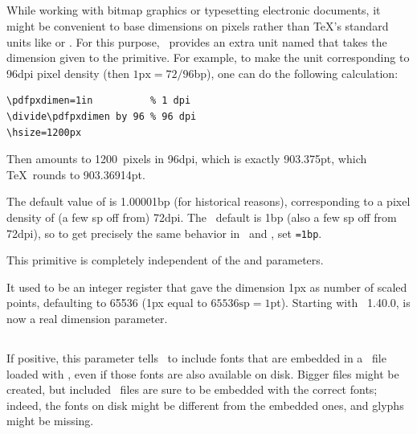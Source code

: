 \documentclass{pdftexmanual}
\begin{document}
\subsection{}

While working with bitmap graphics or typesetting electronic documents,
it might be convenient to base dimensions on pixels rather than \TeX's
standard units like  or . For this purpose, \PDFTEX\
provides an extra unit named  that takes the dimension given to
the \cs{pdfpxdimen} primitive. For example, to make the unit \type{px}
corresponding to 96dpi pixel density (then $\mbox{1px}=72/96$bp), one
can do the following calculation:

\begin{verbatim}
\pdfpxdimen=1in          % 1 dpi
\divide\pdfpxdimen by 96 % 96 dpi
\hsize=1200px
\end{verbatim}

Then  amounts to 1200~pixels in 96dpi, which is exactly
903.375pt, which \TeX\ rounds to 903.36914pt.

The default value of  is 1.00001bp (for historical
reasons), corresponding to a pixel density of (a few sp off from) 72dpi.
The \LUATEX\ default is 1bp (also a few sp off from 72dpi), so to get
precisely the same behavior in \PDFTEX\ and \LUATEX, set
\texttt{=1bp}.

This primitive is completely independent of the
 and  parameters.

 It used to be an integer register that gave the
dimension 1px as number of scaled points, defaulting to 65536 (1px equal
to $\mbox{65536sp}=1$pt). Starting with \PDFTEX\ 1.40.0, \cs{pdfpxdimen}
is now a real dimension parameter.

\subsection{}

If positive, this parameter tells \PDFTEX\ to include fonts that are
embedded in a \PDF\ file loaded with \cs{pdfximage}, even if those fonts
are also available on disk. Bigger files might be created, but included
\PDF\ files are sure to be embedded with the correct fonts; indeed, the
fonts on disk might be different from the embedded ones, and glyphs
might be missing.
\end{document}
